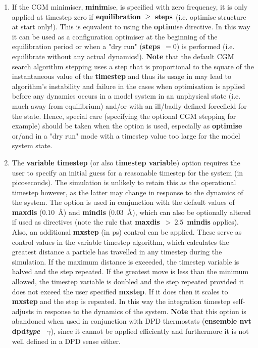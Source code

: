 \begin{enumerate}
\item If the CGM minimiser, {\bf minim}ise, is specified with zero
frequency, it is only applied at timestep zero if
${\bf equilibration}~\ge~{\bf steps}$ (i.e. optimise structure at
start only!).  This is equvalent to using the {\bf optim}ise
directive.  In this way it can be used as a configuration
optimiser at the beginning of the equilibration period or when
a "dry run" ({\bf steps}~$= 0$) is performed (i.e. equilibrate
without any actual dynamics!).  {\bf Note} that the default CGM search
algorithm stepping uses a step that is proportional to the square of
the instantaneous value of the {\bf timestep} and thus its usage in
may lead to algorithm's instability and failure in the cases when
optimisation is applied before any dynamics occurs in a model
system in an unphysical state (i.e. much away from equilibrium)
and/or with an ill/badly defined forcefield for the state.  Hence,
special care (specifying the optional CGM stepping for example)
should be taken when the option is used, especially as {\bf optimise}
or/and in a "dry run" mode with a timestep value too large for the model system state.

\item The {\bf variable timestep} (or also {\bf timestep variable})
option requires the user to specify an initial guess for a
reasonable timestep for the system (in picoseconds).  The simulation
is unlikely to retain this as the operational timestep however, as
the latter may change in response to the dynamics of the system.  The
option is used in conjunction with the default values of {\bf maxdis}
($0.10$~\AA) and {\bf mindis} ($0.03$~\AA), which can also be
optionally altered if used as directives (note the rule that
{\bf maxdis}~$>~2.5$~{\bf mindis} applies).  Also, an additional
{\bf mxstep} (in ps) control can be applied.  These serve as
control values in the variable timestep algorithm, which calculates
the greatest distance a particle has travelled in any timestep
during the simulation.  If the maximum distance is exceeded, the
timestep variable is halved and the step repeated.  If the greatest
move is less than the minimum allowed, the timestep variable is
doubled and the step repeated provided it does not exceed the
user specified {\bf mxstep}.  If it does then it scales to
{\bf mxstep} and the step is repeated.  In this way the integration
timestep self-adjusts in response to the dynamics of the system.
{\bf Note} that this option is abandoned when used in conjunction with
DPD thermostats ({\bf ensemble nvt dpd}\textrm{\textit{\textbf{type}}}~~$\gamma$),
since it cannot be applied efficiently and furthermore it is not
well defined in a DPD sense either.


\end{enumerate}
